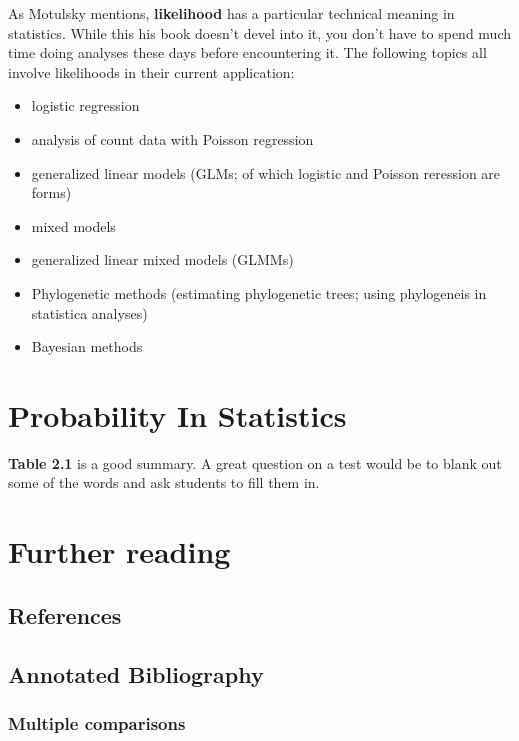 \documentclass[]{book}
\providecommand{\tightlist}{%
  \setlength{\itemsep}{0pt}\setlength{\parskip}{0pt}}
\theoremstyle{definition}
\theoremstyle{definition}
\theoremstyle{definition}
\theoremstyle{remark}
\begin{document}
As Motulsky mentions, \textbf{likelihood} has a particular technical
meaning in statistics. While this his book doesn't devel into it, you
don't have to spend much time doing analyses these days before
encountering it. The following topics all involve likelihoods in their
current application:

\begin{itemize}
\tightlist
\item
  logistic regression
\item
  analysis of count data with Poisson regression
\item
  generalized linear models (GLMs; of which logistic and Poisson
  reression are forms)
\item
  mixed models
\item
  generalized linear mixed models (GLMMs)
\item
  Phylogenetic methods (estimating phylogenetic trees; using phylogeneis
  in statistica analyses)
\item
  Bayesian methods
\end{itemize}

\section{Probability In Statistics}\label{probability-in-statistics}

\textbf{Table 2.1} is a good summary. A great question on a test would
be to blank out some of the words and ask students to fill them in.

\section{Further reading}\label{further-reading-1}

\subsection{References}\label{references-1}

\subsection{Annotated Bibliography}\label{annotated-bibliography-1}

\subsubsection{Multiple comparisons}\label{multiple-comparisons-1}
\end{document}
